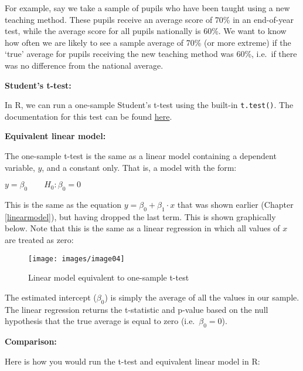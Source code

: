 \documentclass[
  12pt,
]{krantz}
\begin{document}
For example, say we take a sample of pupils who have been taught using a new teaching method. These pupils receive an average score of 70\% in an end-of-year test, while the average score for all pupils nationally is 60\%. We want to know how often we are likely to see a sample average of 70\% (or more extreme) if the `true' average for pupils receiving the new teaching method was 60\%, i.e.~if there was no difference from the national average.

\textbf{Student's t-test:}

In R, we can run a one-sample Student's t-test using the built-in \texttt{t.test()}. The documentation for this test can be found \href{https://www.rdocumentation.org/packages/stats/versions/3.5.3/topics/t.test}{here}.

\textbf{Equivalent linear model:}

The one-sample t-test is the same as a linear model containing a dependent variable, \(y\), and a constant only. That is, a model with the form:

\begin{center}

\(y = \beta_0 \qquad H_0: \beta_0 = 0\)

\end{center}

This is the same as the equation \(y = \beta_0 + \beta_1 \cdot x\) that was shown earlier (Chapter \ref{linearmodel}), but having dropped the last term. This is shown graphically below. Note that this is the same as a linear regression in which all values of \(x\) are treated as zero:

\begin{figure}

{\centering \texttt{[image: images/image04]} 

}

\caption{Linear model equivalent to one-sample t-test}\label{fig:unnamed-chunk-18}
\end{figure}

The estimated intercept (\(\beta_0\)) is simply the average of all the values in our sample. The linear regression returns the t-statistic and p-value based on the null hypothesis that the true average is equal to zero (i.e.~\(\beta_0 = 0\)).

\textbf{Comparison:}

Here is how you would run the t-test and equivalent linear model in R:
\end{document}
